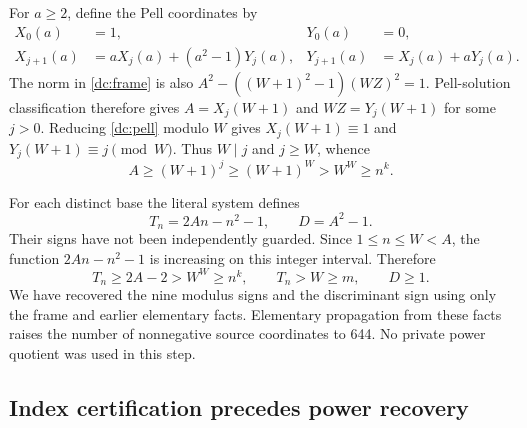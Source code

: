 For $a\ge2$, define the Pell coordinates by
\begin{align}
 X_0(a)&=1,&Y_0(a)&=0,\nonumber\\
 X_{j+1}(a)&=aX_j(a)+(a^2-1)Y_j(a),&
 Y_{j+1}(a)&=X_j(a)+aY_j(a).\label{dc:pell}
\end{align}
The norm in \eqref{dc:frame} is also
$A^2-((W+1)^2-1)(WZ)^2=1$.
Pell-solution classification therefore gives
$A=X_j(W+1)$ and $WZ=Y_j(W+1)$ for some $j>0$.
Reducing \eqref{dc:pell} modulo $W$ gives
$X_j(W+1)\equiv1$ and $Y_j(W+1)\equiv j\pmod W$.
Thus $W\mid j$ and $j\ge W$, whence
\begin{equation}\label{dc:exponentialbound}
 A\ge(W+1)^j\ge(W+1)^W>W^W\ge n^k.
\end{equation}

For each distinct base the literal system defines
\begin{equation}\label{dc:modulus}
 T_n=2An-n^2-1,
 \qquad D=A^2-1.
\end{equation}
Their signs have not been independently guarded.  Since
$1\le n\le W<A$, the function $2An-n^2-1$ is increasing on this
integer interval.  Therefore
\begin{equation}\label{dc:modulusbound}
 T_n\ge2A-2>W^W\ge n^k,
 \qquad T_n>W\ge m,
 \qquad D\ge1.
\end{equation}
We have recovered the nine modulus signs and the discriminant sign
using only the frame and earlier elementary facts.  Elementary
propagation from these facts raises the number of nonnegative source
coordinates to 644.  No private power quotient was used in this step.

\subsection{Index certification precedes power recovery}

